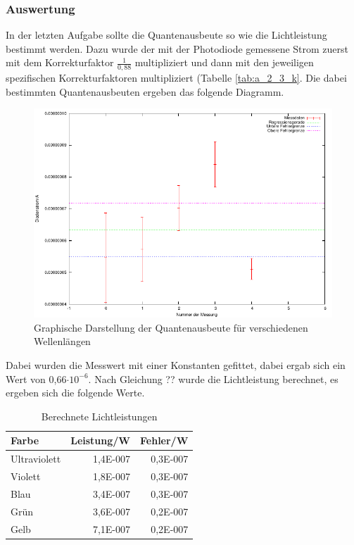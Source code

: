 \documentclass[12px]{scrartcl}
\begin{document}
\subsubsection{Auswertung}
In der letzten Aufgabe sollte die Quantenausbeute so wie die Lichtleistung bestimmt werden. Dazu wurde der mit der Photodiode gemessene Strom zuerst mit dem Korrekturfaktor $\frac{1}{0,88}$ multipliziert und dann mit den jeweiligen spezifischen Korrekturfaktoren multipliziert (Tabelle \ref{tab:a_2_3_k}. Die dabei bestimmten Quantenausbeuten ergeben das folgende Diagramm.

\begin{figure}[H]
\centering
    \includegraphics[scale = 1]{a_2_2.pdf}
  	\caption[Graphische Darstellung der Quantenausbeute für verschiedenen Wellenlängen]{Graphische Darstellung der Quantenausbeute für verschiedenen Wellenlängen}
  \label{fig:a_2_3}
\end{figure}

Dabei wurden die Messwert mit einer Konstanten gefittet, dabei ergab sich ein Wert von 0,66$\cdot 10^{-6}$. Nach Gleichung ?? wurde die Lichtleistung berechnet, es ergeben sich die folgende Werte.

\begin{table}[H]
\caption{Berechnete Lichtleistungen}
\begin{center}
\begin{tabular}{|l|r|r|}
\hline
Farbe & \multicolumn{1}{l|}{Leistung/W} & \multicolumn{1}{l|}{Fehler/W} \\ \hline
Ultraviolett & 1,4E-007 & 0,3E-007 \\ \hline
Violett & 1,8E-007 & 0,3E-007 \\ \hline
Blau & 3,4E-007 & 0,3E-007 \\ \hline
Grün & 3,6E-007 & 0,2E-007 \\ \hline
Gelb & 7,1E-007 & 0,2E-007 \\ \hline
\end{tabular}
\end{center}
\label{tab:a_2_3_l}
\end{table}
\end{document}
